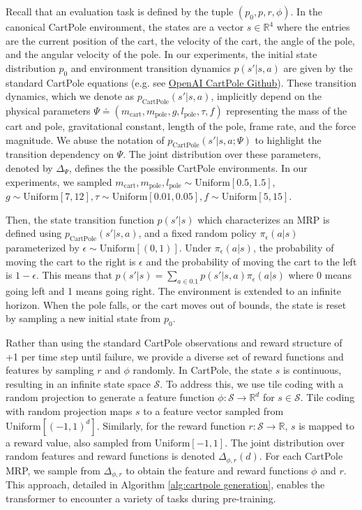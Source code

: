 \documentclass{article}
\newcommand{\fS}{\mathcal{S}}
\newcommand{\R}{\mathbb{R}}
\newcommand{\uniform}[1]{{\text{Uniform}\left[#1\right]}}
\begin{document}
Recall that an evaluation task is defined by the tuple $(p_0, p, r, \phi)$. 
In the canonical CartPole environment, the states are a vector $s \in \R^4$ where the entries are the current position of the cart, the velocity of the cart, the angle of the pole, and the angular velocity of the pole. 
In our experiments, the initial state distribution $p_0$ and environment transition dynamics $p(s'|s,a)$ are given by the standard CartPole equations (e.g. see \href{https://github.com/openai/gym/blob/master/gym/envs/classic\_control/cartpole.py}{OpenAI CartPole Github}). 
These transition dynamics, which we denote as $p_{\text{CartPole}}(s'|s,a)$, implicitly depend on the physical parameters $\Psi \doteq (m_{\text{cart}}, m_{\text{pole}}, g, l_{\text{pole}}, \tau, f)$ representing the mass of the cart and pole, gravitational constant, length of the pole, frame rate, and the force magnitude. We abuse the notation of $p_{\text{CartPole}}(s'|s,a;\Psi)$ to highlight the transition dependency on $\Psi$. The joint distribution over these parameters, denoted by $\Delta_\Psi$, defines the the possible CartPole environments. In our experiments, we sampled $m_{\text{cart}}, m_{\text{pole}}, l_{\text{pole}}  \sim \uniform{0.5,1.5}$, $g\sim \uniform{7,12}, \tau \sim \uniform{0.01,0.05}, f \sim \uniform{5,15}$.
  
Then, the state transition function $p(s'|s)$ which characterizes an MRP is defined using $p_{\text{CartPole}}(s'|s,a)$, and a fixed random policy $\pi_{\epsilon}(a|s)$ parameterized by $\epsilon \sim \uniform{(0,1)}$. 
Under $\pi_{\epsilon}(a|s)$, the probability of moving the cart to the right is $\epsilon$ and the probability of moving the cart to the left is $1-\epsilon$.
This means that $p(s'|s) = \sum_{a\in \qty{0,1}} p(s'|s,a)\pi_\epsilon(a|s)$ where 0 means going left and 1 means going right. The environment is extended to an infinite horizon. When the pole falls, or the cart moves out of bounds, the state is reset by sampling a new initial state from $p_0$.   

Rather than using the standard CartPole observations and reward structure of +1 per time step until failure, we provide a diverse set of reward functions and features by sampling $ r $ and $ \phi $ randomly. In CartPole, the state $ s $ is continuous, resulting in an infinite state space $\fS$. To address this, we use tile coding \citep{sutton2018reinforcement} with a random projection to generate a feature function $\phi: \fS \rightarrow \mathbb{R}^d$ for $s \in \mathcal{S}$. Tile coding with random projection maps $s$ to a feature vector sampled from $\uniform{(-1, 1)^d}$. Similarly, for the reward function $r: \fS \rightarrow \R$, $s$ is mapped to a reward value, also sampled from $\uniform{-1, 1}$. The joint distribution over random features and reward functions is denoted $\Delta_{\phi, r}(d)$. For each CartPole MRP, we sample from $\Delta_{\phi, r}$ to obtain the feature and reward functions $\phi$ and $r$. This approach, detailed in Algorithm \ref{alg:cartpole generation}, enables the transformer to encounter a variety of tasks during pre-training.
\end{document}
